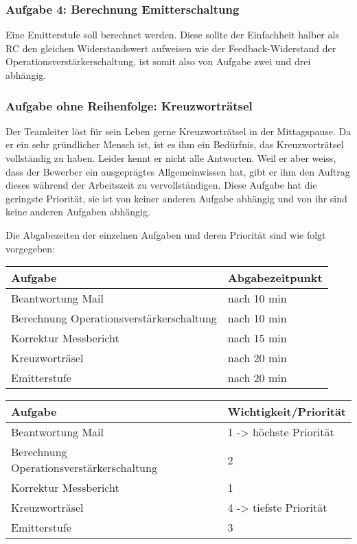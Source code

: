 \subsubsection{Aufgabe 4: Berechnung Emitterschaltung}
Eine Emitterstufe soll berechnet werden. Diese sollte der Einfachheit halber als RC den gleichen Widerstandswert aufweisen wie der Feedback-Widerstand der Operationsverstärkerschaltung, ist somit also von Aufgabe zwei und drei abhängig. 

\subsubsection{Aufgabe ohne Reihenfolge: Kreuzworträtsel}
Der Teamleiter löst für sein Leben gerne Kreuzworträtsel in der Mittagspause. Da er ein sehr gründlicher Mensch ist, ist es ihm ein Bedürfnis, das Kreuzworträtsel vollständig zu haben. Leider kennt er nicht alle Antworten. Weil er aber weiss, dass der Bewerber ein ausgeprägtes Allgemeinwissen hat, gibt er ihm den Auftrag dieses während der Arbeitszeit zu vervollständigen. Diese Aufgabe hat die geringste Priorität, sie ist von keiner anderen Aufgabe abhängig und von ihr sind keine anderen Aufgaben abhängig.

Die Abgabezeiten der einzelnen Aufgaben und deren Priorität sind wie folgt vorgegeben:
\begin{center}
  \begin{tabular}{ | p{7cm} | p{4cm} |}
   \hline
   \textbf{Aufgabe} & \textbf{Abgabezeitpunkt} \\ \hline
   Beantwortung Mail & nach 10 min \\ \hline
   Berechnung Operationsverstärkerschaltung & nach 10 min \\ \hline
   Korrektur Messbericht & nach 15 min \\ \hline
   Kreuzworträsel & nach 20 min \\ \hline
   Emitterstufe & nach 20 min\\ \hline
  \end{tabular}
\end{center}


\begin{center}
  \begin{tabular}{ | p{7cm} | p{4cm} |}
   \hline
   \textbf{Aufgabe} & \textbf{Wichtigkeit/Priorität} \\ \hline
   Beantwortung Mail & 1 -> höchste Priorität\\ \hline
   Berechnung Operationsverstärkerschaltung & 2 \\ \hline
   Korrektur Messbericht & 1 \\ \hline
   Kreuzworträsel & 4 -> tiefste Priorität\\ \hline
   Emitterstufe & 3\\ \hline
  \end{tabular}
\end{center}



